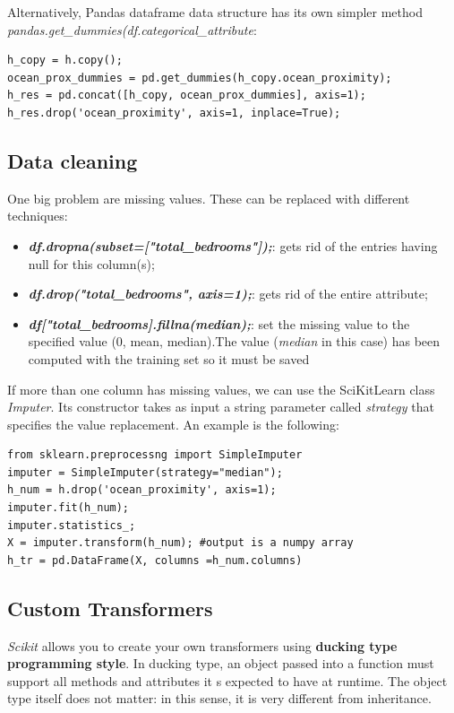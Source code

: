 \documentclass[12pt, letterpaper]{article}
\theoremstyle{definition}
\let\ti\textit
\let\tb\textbf
\begin{document}
Alternatively, Pandas dataframe data structure has its own simpler method \ti{pandas.get\_dummies(df.categorical\_attribute}:
\begin{lstlisting}[caption=Usage of \ti{pd.get\_dummies()}]
h_copy = h.copy();
ocean_prox_dummies = pd.get_dummies(h_copy.ocean_proximity);
h_res = pd.concat([h_copy, ocean_prox_dummies], axis=1);
h_res.drop('ocean_proximity', axis=1, inplace=True);
\end{lstlisting}

\subsection{Data cleaning}
One big problem are missing values. These can be replaced with different techniques:
\begin{itemize}
\item \tb{\ti{df.dropna(subset=["total\_bedrooms"]);}}: gets rid of the entries having null for this column(s);
\item \tb{\ti{df.drop("total\_bedrooms", axis=1);}}: gets rid of the entire attribute;
\item \tb{\ti{df["total\_bedrooms].fillna(median);}}: set the missing value to the specified value (0, mean, median).The value (\ti{median} in this case) has been computed with the training set so it must be saved
\end{itemize}

If more than one column has missing values, we can use the SciKitLearn class \ti{Imputer}. Its constructor takes as input a string parameter called \ti{strategy} that specifies the value replacement. An example is the following:
\begin{lstlisting}[caption=Usage of \ti{SimpleImputer to clean data}]
from sklearn.preprocessng import SimpleImputer
imputer = SimpleImputer(strategy="median");
h_num = h.drop('ocean_proximity', axis=1);
imputer.fit(h_num);
imputer.statistics_;
X = imputer.transform(h_num); #output is a numpy array
h_tr = pd.DataFrame(X, columns =h_num.columns)
\end{lstlisting}

\subsection{Custom Transformers}
\ti{Scikit} allows you to create your own transformers using \tb{ducking type programming style}. In ducking type, an object passed into a function must support all methods and attributes it s expected to have at runtime. The object type itself does not matter: in this sense, it is very different from inheritance. 
\end{document}
